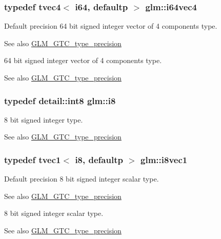 \subsubsection[{i64vec4}]{\setlength{\rightskip}{0pt plus 5cm}typedef tvec4$<$ i64, defaultp $>$ {\bf glm\+::i64vec4}}\label{group__gtc__type__precision_gade5e969a6155752095d2cd603bda9408}
Default precision 64 bit signed integer vector of 4 components type. \begin{DoxySeeAlso}{See also}
\hyperlink{group__gtc__type__precision}{G\+L\+M\+\_\+\+G\+T\+C\+\_\+type\+\_\+precision}
\end{DoxySeeAlso}
64 bit signed integer vector of 4 components type. \begin{DoxySeeAlso}{See also}
\hyperlink{group__gtc__type__precision}{G\+L\+M\+\_\+\+G\+T\+C\+\_\+type\+\_\+precision} 
\end{DoxySeeAlso}
\hypertarget{group__gtc__type__precision_gaae064be68b7d36cd7910c16e8ad18bba}{}
\subsubsection[{i8}]{\setlength{\rightskip}{0pt plus 5cm}typedef detail\+::int8 {\bf glm\+::i8}}\label{group__gtc__type__precision_gaae064be68b7d36cd7910c16e8ad18bba}
8 bit signed integer type. \begin{DoxySeeAlso}{See also}
\hyperlink{group__gtc__type__precision}{G\+L\+M\+\_\+\+G\+T\+C\+\_\+type\+\_\+precision} 
\end{DoxySeeAlso}
\hypertarget{group__gtc__type__precision_ga1cb1ef0f2a9266aba88f161c9062cebc}{}
\subsubsection[{i8vec1}]{\setlength{\rightskip}{0pt plus 5cm}typedef tvec1$<$ i8, defaultp $>$ {\bf glm\+::i8vec1}}\label{group__gtc__type__precision_ga1cb1ef0f2a9266aba88f161c9062cebc}
Default precision 8 bit signed integer scalar type. \begin{DoxySeeAlso}{See also}
\hyperlink{group__gtc__type__precision}{G\+L\+M\+\_\+\+G\+T\+C\+\_\+type\+\_\+precision}
\end{DoxySeeAlso}
8 bit signed integer scalar type. \begin{DoxySeeAlso}{See also}
\hyperlink{group__gtc__type__precision}{G\+L\+M\+\_\+\+G\+T\+C\+\_\+type\+\_\+precision} 
\end{DoxySeeAlso}
\hypertarget{group__gtc__type__precision_ga277312370b6155b37dbf2a6954c42915}{}
